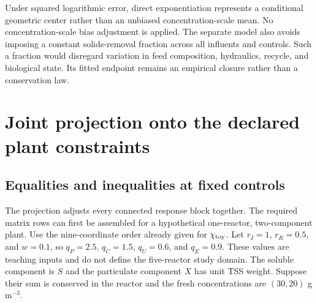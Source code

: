 Under squared logarithmic error, direct exponentiation represents a conditional geometric center rather than an unbiased concentration-scale mean. No concentration-scale bias adjustment is applied. The separate model also avoids imposing a constant solids-removal fraction across all influents and controls. Such a fraction would disregard variation in feed composition, hydraulics, recycle, and biological state. Its fitted endpoint remains an empirical closure rather than a conservation law.

\section{Joint projection onto the declared plant constraints}

\subsection{Equalities and inequalities at fixed controls}

The projection adjusts every connected response block together. The required matrix rows can first be assembled for a hypothetical one-reactor, two-component plant. Use the nine-coordinate order already given for $\chi_{\rm toy}$. Let $r_I=1$, $r_R=0.5$, and $w=0.1$, so $q_P=2.5$, $q_C=1.5$, $q_U=0.6$, and $q_E=0.9$. These values are teaching inputs and do not define the five-reactor study domain. The soluble component is $S$ and the particulate component $X$ has unit TSS weight. Suppose their sum is conserved in the reactor and the fresh concentrations are $(30,20)$ g m$^{-3}$.

